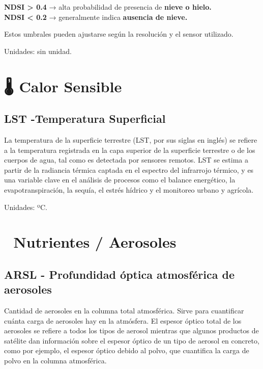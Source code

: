 \documentclass[
]{book}
\begin{document}
\textbf{NDSI \textgreater{} 0.4} → alta probabilidad de presencia de \textbf{nieve o hielo.}\\
\textbf{NDSI \textless{} 0.2} → generalmente indica \textbf{ausencia de nieve.}

Estos umbrales pueden ajustarse según la resolución y el sensor utilizado.

Unidades: sin unidad.

\section{\texorpdfstring{\textbf{🌡️ Calor Sensible}}{🌡️ Calor Sensible}}\label{calor-sensible}

\subsection{\texorpdfstring{\textbf{LST} -Temperatura Superficial}{LST -Temperatura Superficial}}\label{lst--temperatura-superficial}

La temperatura de la superficie terrestre (LST, por sus siglas en inglés) se refiere a la temperatura registrada en la capa superior de la superficie terrestre o de los cuerpos de agua, tal como es detectada por sensores remotos. LST se estima a partir de la radiancia térmica captada en el espectro del infrarrojo térmico, y es una variable clave en el análisis de procesos como el balance energético, la evapotranspiración, la sequía, el estrés hídrico y el monitoreo urbano y agrícola.

Unidades: ºC.

\section{\texorpdfstring{\textbf{💨 Nutrientes / Aerosoles}}{💨 Nutrientes / Aerosoles}}\label{nutrientes-aerosoles}

\subsection{\texorpdfstring{\textbf{ARSL} - Profundidad óptica atmosférica de aerosoles}{ARSL - Profundidad óptica atmosférica de aerosoles}}\label{arsl---profundidad-uxf3ptica-atmosfuxe9rica-de-aerosoles}

Cantidad de aerosoles en la columna total atmosférica. Sirve para cuantificar cuánta carga de aerosoles hay en la atmósfera. El espesor óptico total de los aerosoles se refiere a todos los tipos de aerosol mientras que algunos productos de satélite dan información sobre el espesor óptico de un tipo de aerosol en concreto, como por ejemplo, el espesor óptico debido al polvo, que cuantifica la carga de polvo en la columna atmosférica.
\end{document}

